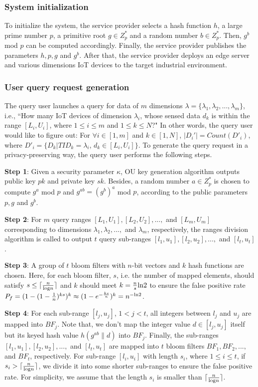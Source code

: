 \documentclass[IEEE JOURNAL OF BIOMEDICAL AND HEALTH INFORMATICS]{IEEEtran}
\begin{document}
\subsubsection{System initialization}
To initialize the system, the service provider selects a hash function $h$, a large prime number $p$, a primitive root $g\in Z^*_p$ and a random number $b\in Z^*_p$. Then, $g^b$ mod $p$ can be computed accordingly. Finally, the service provider publishes the parameters $h, p, g$ and $g^b$. After that, the service provider deploys an edge server and various dimensions IoT devices to the target industrial environment.

\subsubsection{User query request generation}
The query user launches a query for data of $m$ dimensions $\lambda =\{\lambda_1, \lambda_2, ... , \lambda_m\}$, i.e., ``How many IoT devices of dimension $\lambda_i$, whose sensed data $d_k$ is within the range $[L_i, U_i]$, where $1 \le i \le m$ and $1 \le k \le N$?"  In other words, the query user would like to figure out: For $\forall i \in [1, m]$ and $ k \in [1, N]$, $|D_i'|=Count(D'_i)$, where $D'_i=\{D_k | TID_k=\lambda_i$, $d_k \in [L_i, U_i]\}$. To generate the query request in a privacy-preserving way, the query user performs the following steps.

\textbf{Step 1}: Given a security parameter $\kappa$, OU key generation algorithm outputs public key $pk$ and private key $sk$. Besides, a random number $a\in Z_p^*$ is chosen to compute $g^a$ mod $p$ and $g^{ab}=(g^b)^a$ mod $p$, according to the public parameters $p,g$ and $g^b$.
	
\textbf{Step 2}: For $m$ query ranges $[L_1, U_1], [L_2, U_2], ... ,$ and $[L_m, U_m]$ corresponding to dimensions $\lambda_1, \lambda_2, ...,$ and $\lambda_m$, respectively, the ranges division algorithm is called to output $t$ query sub-ranges $[l_1, u_1], [l_2, u_2], ... ,$ and $[l_t, u_t]$. 

\textbf{Step 3}: A group of $t$ bloom filters with $n$-bit vectors and $k$ hash functions are chosen. Here, for each bloom filter, $s$, i.e. the number of mapped elements, should satisfy $s \le \lceil \frac{n}{{\rm log}n} \rceil $ and $k$ should meet $k=\frac{n}{s}{\rm ln}2$ to ensure the false positive rate $P_f=(1-(1-\frac{1}{n})^{ks})^k \approx (1-e^{-\frac{ks}{n}})^k  =n^{-{\rm ln}2}$.

\textbf{Step 4}: For each sub-range $[l_j, u_j]$, $1<j<t$, all integers between $l_j$ and $u_j$ are mapped into $BF_j$. Note that, we don't map the integer value $d\in [l_j, u_j]$ itself but its keyed hash value $h(g^{ab}\|d)$ into $BF_j$. Finally, the sub-ranges $[l_1, u_1], [l_2, u_2], ... ,$ and $ [l_t, u_t]$ are mapped into $t$ bloom filters $BF_1, BF_2, ...,$ and $ BF_t$, respectively. For sub-range $[l_i, u_i]$ with length $s_i$, where $1 \le i \le t$, if $s_i  >\lceil \frac{n}{{\rm log} n} \rceil$, we divide it into some shorter sub-ranges to ensure the false positive rate. For simplicity, we assume that the length $s_i$ is smaller than $\lceil \frac{n}{{\rm log} n} \rceil$.
\end{document}
